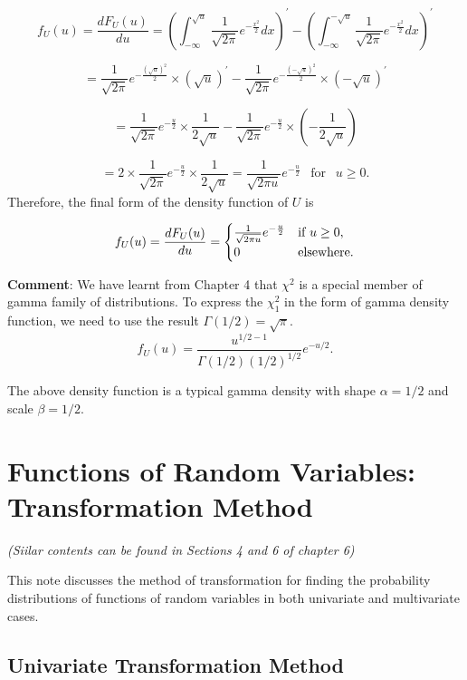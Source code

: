 \documentclass[
]{book}
\begin{document}
\[
f_U(u) = \frac{dF_U(u)}{du} =\left( \int_{-\infty}^{\sqrt{u}} \frac{1}{\sqrt{2\pi}}e^{-\frac{x^2}{2}}dx\right)^\prime - \left( \int_{-\infty}^{-\sqrt{u}} \frac{1}{\sqrt{2\pi}}e^{-\frac{x^2}{2}}dx\right)^\prime
\]

\[
=\frac{1}{\sqrt{2\pi}}e^{-\frac{(\sqrt{u})^2}{2}}\times (\sqrt{u})^\prime -\frac{1}{\sqrt{2\pi}}e^{-\frac{(-\sqrt{u})^2}{2}}\times (-\sqrt{u})^\prime
\]

\[
=\frac{1}{\sqrt{2\pi}}e^{-\frac{u}{2}}\times \frac{1}{2\sqrt{u}} -\frac{1}{\sqrt{2\pi}}e^{-\frac{u}{2}}\times (-\frac{1}{2\sqrt{u}})
\]

\[
=2\times\frac{1}{\sqrt{2\pi}}e^{-\frac{u}{2}}\times \frac{1}{2\sqrt{u}} = \frac{1}{\sqrt{2\pi u}}e^{-\frac{u}{2}} \ \ \text{ for } \ \ u \ge 0.
\]
Therefore, the final form of the density function of \(U\) is

\[
\displaystyle f_U(u) = \frac{dF_U(u)}{du} = \begin{cases} 
 \frac{1}{\sqrt{2\pi u}}e^{-\frac{u}{2}} & \text{if $ u \ge 0$}, \\ 
 0 & \text{elsewhere}.
 \end{cases}
\]

\textbf{\color{red}Comment}: We have learnt from Chapter 4 that \(\chi^2\) is a special member of gamma family of distributions. To express the \(\chi^2_1\) in the form of gamma density function, we need to use the result \(\Gamma(1/2) = \sqrt{\pi}\).
\[
f_U(u) = \frac{u^{1/2-1}}{\Gamma(1/2)(1/2)^{1/2}}e^{-u/2}.
\]

The above density function is a typical gamma density with shape \(\alpha = 1/2\) and scale \(\beta = 1/2\).

\hfill\break

\hypertarget{functions-of-random-variables-transformation-method}{%
\chapter{Functions of Random Variables: Transformation Method}\label{functions-of-random-variables-transformation-method}}

\emph{(Siilar contents can be found in Sections 4 and 6 of chapter 6)}

This note discusses the method of transformation for finding the probability distributions of functions of random variables in both univariate and multivariate cases.

\hfill\break

\hypertarget{univariate-transformation-method}{%
\section{Univariate Transformation Method}\label{univariate-transformation-method}}
\end{document}
